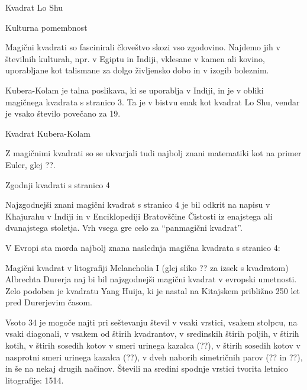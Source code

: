 \documentclass[a4paper,12pt]{article}
\begin{document}
Kvadrat Lo Shu


Kulturna pomembnost

Magični kvadrati so fascinirali človeštvo skozi vso zgodovino. Najdemo jih
v številnih kulturah, npr. v Egiptu in Indiji, vklesane v kamen ali
kovino, uporabljane kot talismane za dolgo življensko dobo in v
izogib boleznim.

Kubera-Kolam je talna poslikava, ki se uporablja v Indiji, in je v
obliki magičnega kvadrata s stranico 3. Ta je v bistvu enak kot kvadrat
Lo Shu, vendar je vsako število povečano za 19.

Kvadrat Kubera-Kolam

Z magičnimi kvadrati so se ukvarjali tudi najbolj znani matematiki kot na
primer Euler, glej ??.


Zgodnji kvadrati s stranico 4

Najzgodnejši znani magični kvadrat s stranico 4 je bil odkrit na napisu
v Khajurahu v Indiji in v Enciklopediji Bratovščine Čistosti iz enajstega
ali dvanajstega stoletja. Vrh vsega gre celo za "`panmagični kvadrat"'.

V Evropi sta morda najbolj znana naslednja magična kvadrata s stranico 4:

Magični kvadrat v litografiji Melancholia I (glej sliko ??
za izsek s kvadratom) Albrechta Durerja naj bi bil najzgodnejši magični kvadrat
v evropski umetnosti. Zelo podoben je kvadratu Yang Huija, ki je nastal na Kitajskem
približno 250 let pred Durerjevim časom.

Vsoto 34 je mogoče najti pri seštevanju števil v vsaki vrstici, vsakem stolpcu,
na vsaki diagonali, v vsakem od štirih kvadrantov, v sredinskih štirih poljih,
v štirih kotih, v štirih sosedih kotov v smeri urinega kazalca (??), v
štirih sosedih kotov v nasprotni smeri urinega kazalca (??), v dveh naborih
simetričnih parov (?? in ??), in še na nekaj drugih načinov.
Števili na sredini spodnje vrstici tvorita letnico litografije: 1514.
\end{document}
